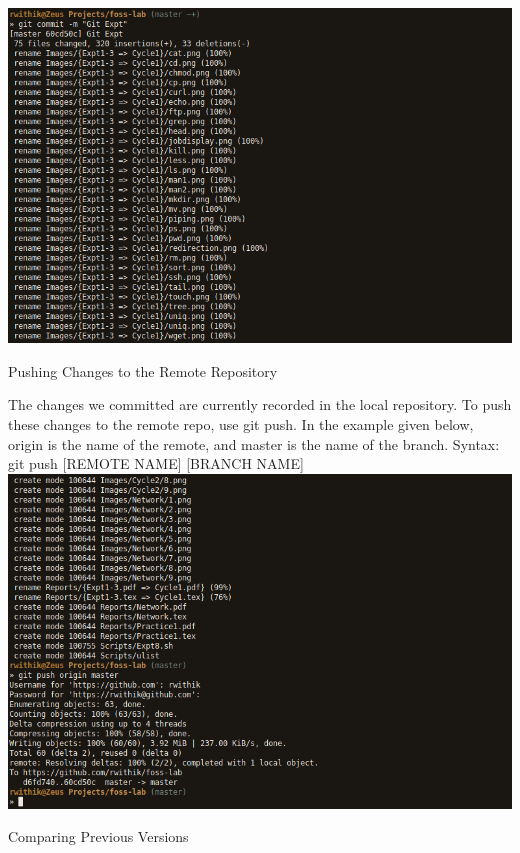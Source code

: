 \documentclass[10pt,a4paper,titlepage]{report}
\begin{document}
\includegraphics[scale=.45]{../Images/VCS/4.png}
\begin{center}
\Large{Pushing Changes to the Remote Repository}
\end{center}
\vspace{.5cm}
\par The changes we committed are currently recorded in the local repository. To push these changes to the remote repo, use {\color{red} git push}. In the example given below, origin is the name of the remote, and master is the name of the branch. \newline\newline
Syntax: git push [REMOTE NAME] [BRANCH NAME]
\newline\newline
\includegraphics[scale=.45]{../Images/VCS/5.png}
\pagebreak
\begin{center}
\Large{Comparing Previous Versions}
\end{center}
\end{document}
